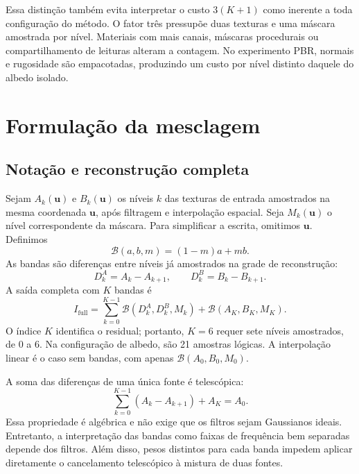 Essa distinção também evita interpretar o custo $3(K+1)$ como inerente a toda configuração do método. O fator três pressupõe duas texturas e uma máscara amostrada por nível. Materiais com mais canais, máscaras procedurais ou compartilhamento de leituras alteram a contagem. No experimento PBR, normais e rugosidade são empacotadas, produzindo um custo por nível distinto daquele do albedo isolado.

\section{Formulação da mesclagem}
\subsection{Notação e reconstrução completa}
Sejam $A_k(\mathbf{u})$ e $B_k(\mathbf{u})$ os níveis $k$ das texturas de entrada amostrados na mesma coordenada $\mathbf{u}$, após filtragem e interpolação espacial. Seja $M_k(\mathbf{u})$ o nível correspondente da máscara. Para simplificar a escrita, omitimos $\mathbf{u}$. Definimos
\begin{equation}
\mathcal{B}(a,b,m)=(1-m)a+mb.
\end{equation}
As bandas são diferenças entre níveis já amostrados na grade de reconstrução:
\begin{equation}
D^A_k=A_k-A_{k+1},\qquad D^B_k=B_k-B_{k+1}.
\end{equation}
A saída completa com $K$ bandas é
\begin{equation}
I_{\mathrm{full}}=\sum_{k=0}^{K-1}\mathcal{B}(D^A_k,D^B_k,M_k)
+\mathcal{B}(A_K,B_K,M_K).
\label{eq:full}
\end{equation}
O índice $K$ identifica o residual; portanto, $K=6$ requer sete níveis amostrados, de 0 a 6. Na configuração de albedo, são 21 amostras lógicas. A interpolação linear é o caso sem bandas, com apenas $\mathcal{B}(A_0,B_0,M_0)$.

A soma das diferenças de uma única fonte é telescópica:
\begin{equation}
\sum_{k=0}^{K-1}(A_k-A_{k+1})+A_K=A_0.
\end{equation}
Essa propriedade é algébrica e não exige que os filtros sejam Gaussianos ideais. Entretanto, a interpretação das bandas como faixas de frequência bem separadas depende dos filtros. Além disso, pesos distintos para cada banda impedem aplicar diretamente o cancelamento telescópico à mistura de duas fontes.

